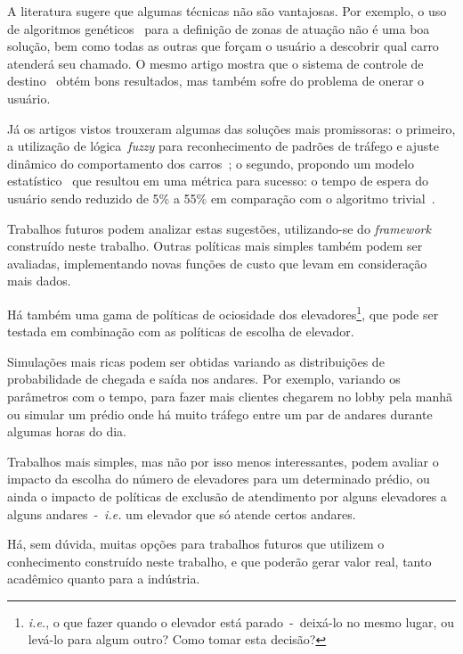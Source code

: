A literatura sugere que algumas técnicas não são vantajosas. Por exemplo, o uso
de algoritmos genéticos~\cite{KOEHLEROTTIGER02} para a definição de zonas de
atuação não é uma boa solução, bem como todas as outras que forçam o usuário a
descobrir qual carro atenderá seu chamado. O mesmo artigo mostra que o sistema
de controle de destino~\cite{KOEHLEROTTIGER02} obtém bons resultados, mas também
sofre do problema de onerar o usuário.

Já os artigos vistos trouxeram algumas das soluções mais promissoras: o
primeiro, a utilização de lógica~\textit{fuzzy} para reconhecimento de padrões
de tráfego e ajuste dinâmico do comportamento dos carros~\cite{marja97}; o
segundo, propondo um modelo estatístico~\cite{DBLP:journals/corr/abs-1212-2499}
que resultou em uma métrica para sucesso: o tempo de espera do usuário sendo
reduzido de 5\% a 55\% em comparação com o algoritmo
trivial~\cite{DBLP:journals/corr/abs-1212-2499}.

Trabalhos futuros podem analizar estas sugestões, utilizando-se do
\textit{framework} construído neste trabalho. Outras políticas mais simples
também podem ser avaliadas, implementando novas funções de custo que levam em
consideração mais dados.

Há também uma gama de políticas de ociosidade dos
elevadores\footnote{\textit{i.e.}, o que fazer quando o elevador está
  parado~-~deixá-lo no mesmo lugar, ou levá-lo para algum outro? Como tomar esta
decisão?}, que pode ser testada em combinação com as políticas de escolha de elevador.

Simulações mais ricas podem ser obtidas variando as distribuições de
probabilidade de chegada e saída nos andares. Por exemplo, variando os
parâmetros com o tempo, para fazer mais clientes chegarem no lobby pela manhã ou
simular um prédio onde há muito tráfego entre um par de andares durante algumas
horas do dia.

Trabalhos mais simples, mas não por isso menos interessantes, podem avaliar o
impacto da escolha do número de elevadores para um determinado prédio, ou ainda
o impacto de políticas de exclusão de atendimento por alguns elevadores a alguns
andares~-~\textit{i.e.} um elevador que só atende certos andares.

Há, sem dúvida, muitas opções para trabalhos futuros que utilizem o conhecimento
construído neste trabalho, e que poderão gerar valor real, tanto acadêmico
quanto para a indústria.
